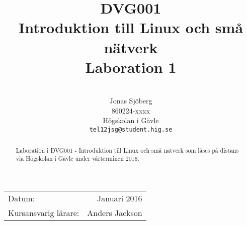 \documentclass[11pt,a4paper]{article}
\title{\textsc{DVG001}                         \\ 
       Introduktion till Linux och små nätverk \\ 
       Laboration 1}
\author{                                 \\
  Jonas Sjöberg                          \\
  860224-xxxx                            \\
  Högskolan i Gävle                      \\
  \texttt{tel12jsg@student.hig.se}       \\
}
\date{}
\begin{document}
  \maketitle

  \begin{center}
  \begin{tabular}{l r}
    Datum:               & Januari 2016   \\
    Kursansvarig lärare: & Anders Jackson
  \end{tabular}
  \end{center}

  \begin{abstract}
    Laboration i DVG001 - Introduktion till Linux och små nätverk som läses på distans via Högskolan i Gävle under vårterminen 2016.
  \end{abstract}

  \newpage
  \setcounter{tocdepth}{3}
  \tableofcontents

  \newpage
  \listoffigures

  
  
% 

\end{document}
